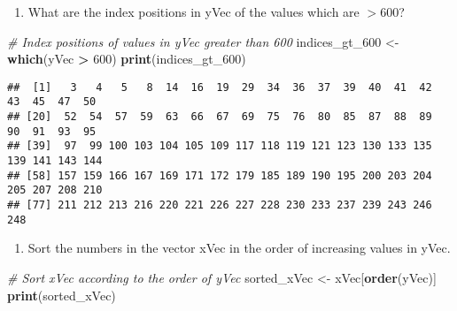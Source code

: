 \documentclass[
]{article}
\newenvironment{Shaded}{\begin{snugshade}}{\end{snugshade}}
\newcommand{\CommentTok}[1]{\textcolor[rgb]{0.56,0.35,0.01}{\textit{#1}}}
\newcommand{\DecValTok}[1]{\textcolor[rgb]{0.00,0.00,0.81}{#1}}
\newcommand{\FunctionTok}[1]{\textcolor[rgb]{0.13,0.29,0.53}{\textbf{#1}}}
\newcommand{\NormalTok}[1]{#1}
\newcommand{\OtherTok}[1]{\textcolor[rgb]{0.56,0.35,0.01}{#1}}
\newcommand{\SpecialCharTok}[1]{\textcolor[rgb]{0.81,0.36,0.00}{\textbf{#1}}}
\providecommand{\tightlist}{%
  \setlength{\itemsep}{0pt}\setlength{\parskip}{0pt}}
\begin{document}
\begin{enumerate}
\def\labelenumi{(\alph{enumi})}
\setcounter{enumi}{2}
\tightlist
\item
  What are the index positions in yVec of the values which are
  \(> 600\)?
\end{enumerate}

\begin{Shaded}
\begin{Highlighting}[]
\CommentTok{\# Index positions of values in yVec greater than 600}
\NormalTok{indices\_gt\_600 }\OtherTok{\textless{}{-}} \FunctionTok{which}\NormalTok{(yVec }\SpecialCharTok{\textgreater{}} \DecValTok{600}\NormalTok{)}
\FunctionTok{print}\NormalTok{(indices\_gt\_600)}
\end{Highlighting}
\end{Shaded}

\begin{verbatim}
##  [1]   3   4   5   8  14  16  19  29  34  36  37  39  40  41  42  43  45  47  50
## [20]  52  54  57  59  63  66  67  69  75  76  80  85  87  88  89  90  91  93  95
## [39]  97  99 100 103 104 105 109 117 118 119 121 123 130 133 135 139 141 143 144
## [58] 157 159 166 167 169 171 172 179 185 189 190 195 200 203 204 205 207 208 210
## [77] 211 212 213 216 220 221 226 227 228 230 233 237 239 243 246 248
\end{verbatim}

\begin{enumerate}
\def\labelenumi{(\alph{enumi})}
\setcounter{enumi}{3}
\tightlist
\item
  Sort the numbers in the vector xVec in the order of increasing values
  in yVec.
\end{enumerate}

\begin{Shaded}
\begin{Highlighting}[]
\CommentTok{\# Sort xVec according to the order of yVec}
\NormalTok{sorted\_xVec }\OtherTok{\textless{}{-}}\NormalTok{ xVec[}\FunctionTok{order}\NormalTok{(yVec)]}
\FunctionTok{print}\NormalTok{(sorted\_xVec)}
\end{Highlighting}
\end{Shaded}
\end{document}
